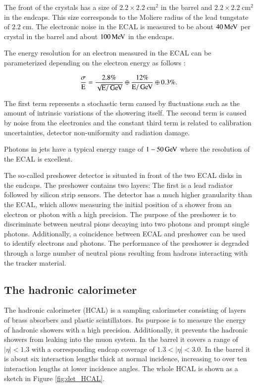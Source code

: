 The front of the crystals has a size of $2.2 \times 2.2 \;\si{\centi \meter \squared}$ in the barrel and $2.2 \times 2.2 \;\si{\centi \meter \squared}$ in the endcaps. This size corresponds to the Moliere radius of the 
lead tungstate of $2.2 \;\si{\centi \meter}$.
The electronic noise in the ECAL is measured to be about $40 \,\text{Me\hspace{-.08em}V}$ per crystal in the barrel and about $100 \,\text{Me\hspace{-.08em}V}$ in the endcaps.

The energy resolution for an electron measured in the ECAL can be parameterized depending on the electron energy as follows \cite{Sirunyan:2017ulk}:

\begin{equation}
\frac{\sigma}{\mathrm{E}} = \frac{2.8\%}{\sqrt{\mathrm{E}/\,\text{Ge\hspace{-.08em}V}}} \oplus \frac{12\%}{\mathrm{E} / \,\text{Ge\hspace{-.08em}V}} \oplus 0.3\%.
\end{equation}

The first term represents a stochastic term caused by fluctuations such as the amount of intrinsic variations of the showering itself. The second term is caused by noise from the electronics and the constant third term is related
to calibration uncertainties, detector non-uniformity and radiation damage.

Photons in jets have a typical energy range of $1-50 \,\text{Ge\hspace{-.08em}V}$ where the resolution of the ECAL is excellent.

The so-called preshower detector is situated in front of the two ECAL disks in the endcaps.
The preshower contains two layers: The first is a lead radiator followed by silicon strip sensors.
The detector has a much higher granularity than the ECAL, which allows measuring the initial position of a shower from an electron or photon with a high precision.
The purpose of the preshower is to discriminate  between neutral pions decaying into two photons and prompt single photons.
Additionally, a coincidence between ECAL and preshower can be used to identify electrons and photons.
The performance of the preshower is degraded through a large number of neutral pions resulting from hadrons interacting with the tracker material.

\subsection{The hadronic calorimeter}

The hadronic calorimeter (HCAL)\cite{Bayatian:922757} is a sampling calorimeter consisting of layers of brass absorbers and plastic scintillators.
Its purpose is to measure the energy of hadronic showers with a high precision. Additionally, it prevents the hadronic showers from leaking into the muon system.
In the barrel it covers a range of $|\eta|< 1.3$ with a corresponding endcap coverage of $1.3 <|\eta|< 3.0$.
In the barrel it is about six interaction lengths thick at normal incidence, increasing to over ten interaction lengths at lower incidence angles.
The whole HCAL is shown as a sketch in Figure \ref{fig:det_HCAL}.




